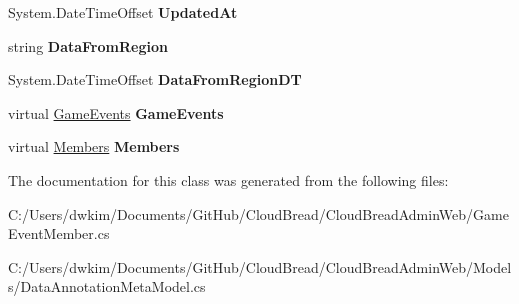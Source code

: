\begin{DoxyCompactItemize}
\item 
System.\+Date\+Time\+Offset {\bfseries Updated\+At}\hypertarget{a00081_afdda990dd3e874e25b4574fe37e41e0e}{}\label{a00081_afdda990dd3e874e25b4574fe37e41e0e}

\item 
string {\bfseries Data\+From\+Region}\hypertarget{a00081_aeaa6ff575a463307fb51e68d15b2107c}{}\label{a00081_aeaa6ff575a463307fb51e68d15b2107c}

\item 
System.\+Date\+Time\+Offset {\bfseries Data\+From\+Region\+DT}\hypertarget{a00081_a939b81b2f0526959256daba5a33bd924}{}\label{a00081_a939b81b2f0526959256daba5a33bd924}

\item 
virtual \hyperlink{a00083}{Game\+Events} {\bfseries Game\+Events}\hypertarget{a00081_ae56ccac6b760bafb3a2bffadeb7afd9f}{}\label{a00081_ae56ccac6b760bafb3a2bffadeb7afd9f}

\item 
virtual \hyperlink{a00145}{Members} {\bfseries Members}\hypertarget{a00081_a9bb13544fabf664de6ae66a867301000}{}\label{a00081_a9bb13544fabf664de6ae66a867301000}

\end{DoxyCompactItemize}


The documentation for this class was generated from the following files\+:\begin{DoxyCompactItemize}
\item 
C\+:/\+Users/dwkim/\+Documents/\+Git\+Hub/\+Cloud\+Bread/\+Cloud\+Bread\+Admin\+Web/Game\+Event\+Member.\+cs\item 
C\+:/\+Users/dwkim/\+Documents/\+Git\+Hub/\+Cloud\+Bread/\+Cloud\+Bread\+Admin\+Web/\+Models/Data\+Annotation\+Meta\+Model.\+cs\end{DoxyCompactItemize}
